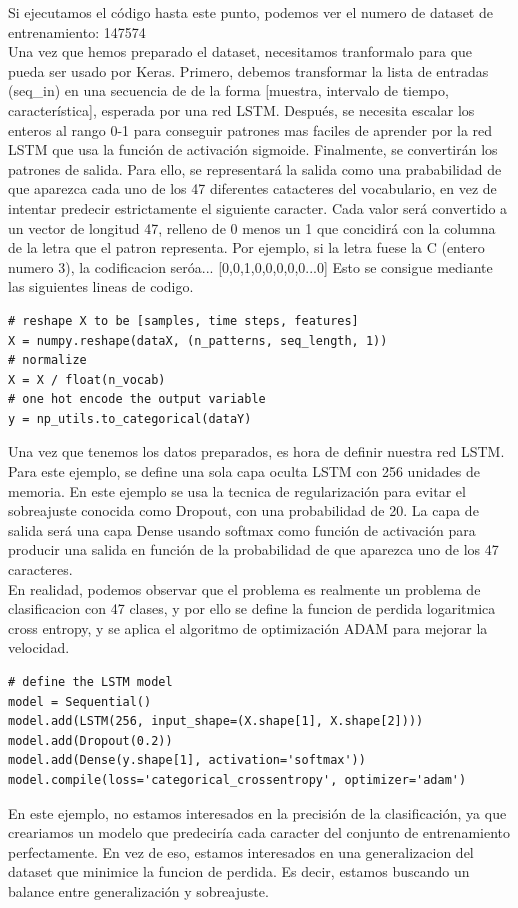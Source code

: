 Si ejecutamos el código hasta este punto, podemos ver el numero de dataset de entrenamiento: 147574\\
Una vez que hemos preparado el dataset, necesitamos tranformalo para que pueda ser usado por Keras. Primero, debemos transformar la lista de entradas (seq\_in) en una secuencia de de la forma [muestra, intervalo de tiempo, característica], esperada por una red LSTM. Después, se necesita escalar los enteros al rango 0-1 para conseguir patrones mas faciles de aprender por la red LSTM que usa la función de activación sigmoide. Finalmente, se convertirán los patrones de salida. Para ello, se representará la salida como una prababilidad de que aparezca cada uno de los 47 diferentes catacteres del vocabulario, en vez de intentar predecir estrictamente el siguiente caracter. Cada valor será convertido a un vector de longitud 47, relleno de 0 menos un 1 que concidirá con la columna de la letra que el patron representa. Por ejemplo, si la letra fuese la C (entero numero 3), la codificacion seróa... [0,0,1,0,0,0,0,0...0]
Esto se consigue mediante las siguientes lineas de codigo.
\begin{verbatim}
# reshape X to be [samples, time steps, features]
X = numpy.reshape(dataX, (n_patterns, seq_length, 1))
# normalize
X = X / float(n_vocab)
# one hot encode the output variable
y = np_utils.to_categorical(dataY)
\end{verbatim}
Una vez que tenemos los datos preparados, es hora de definir nuestra red LSTM. Para este ejemplo, se define una sola capa oculta LSTM con 256 unidades de memoria. En este ejemplo se usa la tecnica de regularización para evitar el sobreajuste conocida como Dropout, con una probabilidad de 20. La capa de salida será una capa Dense usando softmax como función de activación para producir una salida en función de la probabilidad de que aparezca uno de los 47 caracteres.\\
En realidad, podemos observar que el problema es realmente un problema de clasificacion con 47 clases, y por ello se define la funcion de perdida logaritmica cross entropy, y se aplica el algoritmo de optimización ADAM para mejorar la velocidad.
\begin{verbatim}
# define the LSTM model
model = Sequential()
model.add(LSTM(256, input_shape=(X.shape[1], X.shape[2])))
model.add(Dropout(0.2))
model.add(Dense(y.shape[1], activation='softmax'))
model.compile(loss='categorical_crossentropy', optimizer='adam')
\end{verbatim}
En este ejemplo, no estamos interesados en la precisión de la clasificación, ya que creariamos un modelo que predeciría cada caracter del conjunto de entrenamiento perfectamente. En vez de eso, estamos interesados en una generalizacion del dataset que minimice la funcion de perdida. Es decir, estamos buscando un balance entre generalización y sobreajuste.\\
